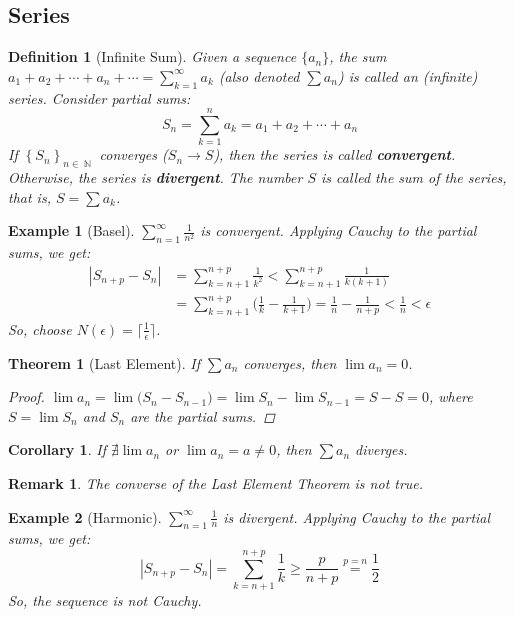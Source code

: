 \documentclass[12pt]{article}
\newcommand{\seq}[2]{\left\{{#1}\right\}_{#2 \in\N}}
\DeclareMathOperator{\N}{\mathbb{N}}
\newtheorem{theorem}{Theorem}[subsection]
\newtheorem{definition}{Definition}[subsection]
\newtheorem{corollary}{Corollary}[subsection]
\newtheorem{example}{Example}[subsection]
\newtheorem{remark}{Remark}[subsection]
\begin{document}
\pagebreak

\subsection{Series}

\begin{definition}[Infinite Sum]
  Given a sequence $\{a_n\}$, the sum $a_1+a_2+\cdots+a_n+\cdots=\sum_{k=1}^\infty a_k$ (also denoted $\sum a_n$) is called an (infinite) series. Consider partial sums:
  $$S_n=\sum_{k=1}^n a_k=a_1+a_2+\cdots+a_n$$
  If $\seq{S_n}{n}$ converges ($S_n\to S$), then the series is called \textbf{convergent}. Otherwise, the series is \textbf{divergent}. The number $S$ is called the sum of the series, that is, $S=\sum a_k$.
\end{definition}

\begin{example}[Basel]
  $\displaystyle\sum_{n=1}^\infty\frac{1}{n^2}$ is convergent. Applying Cauchy to the partial sums, we get:
  \begin{align*}
    |S_{n+p}-S_n|&=\sum_{k=n+1}^{n+p} \frac{1}{k^2} <\sum_{k=n+1}^{n+p} \frac{1}{k(k+1)}\\
    &=\sum_{k=n+1}^{n+p} \bigg(\frac{1}{k}-\frac{1}{k+1}\bigg)=\frac{1}{n}-\frac{1}{n+p}<\frac{1}{n}<\epsilon
  \end{align*}
  So, choose $N(\epsilon)=\lceil\frac{1}{\epsilon}\rceil$.
\end{example}

\begin{theorem}[Last Element]
  If $\sum a_n$ converges, then $\lim a_n=0$.
  \begin{proof}
    $\lim a_n =\lim \big(S_n-S_{n-1}\big)=\lim S_n - \lim S_{n-1}=S-S=0$, where $S=\lim S_n$ and $S_n$ are the partial sums.
  \end{proof}
\end{theorem}

\begin{corollary}
  If $\nexists\lim a_n$ or $\lim a_n = a \neq 0$, then $\sum a_n$ diverges.
\end{corollary}

\begin{remark}
  The converse of the Last Element Theorem is not true.
\end{remark}

\begin{example}[Harmonic]
  $\displaystyle\sum_{n=1}^\infty\frac{1}{n}$ is divergent. Applying Cauchy to the partial sums, we get:
  $$|S_{n+p}-S_n|=\sum_{k=n+1}^{n+p} \frac{1}{k} \geq \frac{p}{n+p}\overset{p=n}{=}\frac{1}{2}$$
  So, the sequence is not Cauchy.
\end{example}
\end{document}
